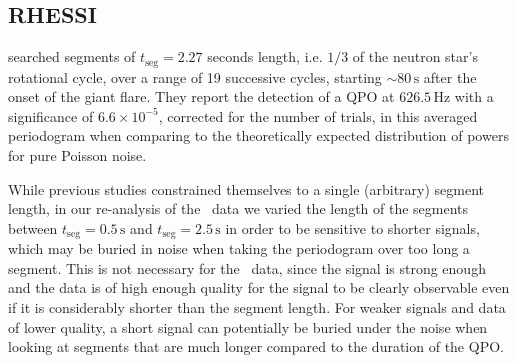 \documentclass{emulateapj}
\begin{document}
\subsection{RHESSI}
\label{sec:rhessi_results}

\citealt{Watts06} searched segments of $t_{\mathrm{seg}} = 2.27$ seconds length, i.e. $1/3$ of the neutron star's rotational cycle, over a range of 19 successive cycles, starting $\sim 80 \, \mathrm{s}$ after the onset of the giant flare. They report the detection of a QPO at $626.5 \, \mathrm{Hz}$ with a significance of $6.6 \times 10^{-5}$, corrected for the number of trials, in this averaged periodogram when comparing to the theoretically expected distribution of powers for pure Poisson noise.

While previous studies constrained themselves to a single (arbitrary) segment length, in our re-analysis of the \rhessi\ data we varied the length of the segments between $t_{\mathrm{seg}} = 0.5 \, \mathrm{s}$ and $t_{\mathrm{seg}} = 2.5 \, \mathrm{s}$  in order to be sensitive to shorter signals, which may be buried in noise when taking the periodogram over too long a segment. This is not necessary for the \rxte\ data, since the signal is strong enough and the data is of high enough quality for the signal to be clearly observable even if it is considerably shorter than the segment length. For weaker signals and data of lower quality, a short signal can potentially be buried under the noise when looking at segments that are much longer compared to the duration of the QPO. 
\end{document}
